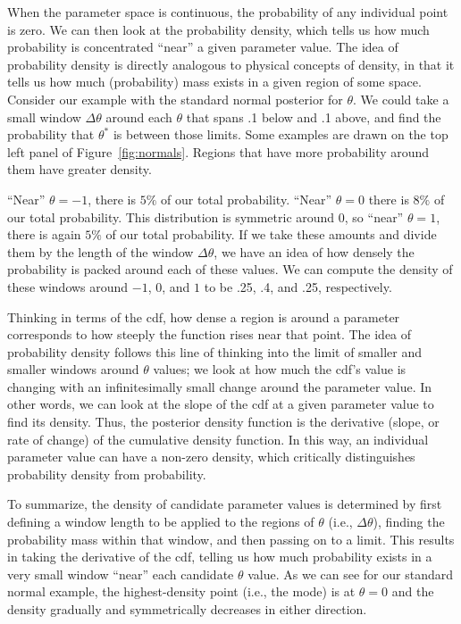 \documentclass[man]{apa}
\begin{document}
When the parameter space is continuous, the probability of any individual point is zero. We can then look at the probability density, which tells us how much probability is concentrated ``near'' a given parameter value. The idea of probability density is directly analogous to physical concepts of density, in that it tells us how much (probability) mass exists in a given region of some space. Consider our example with the standard normal posterior for $\theta$. We could take a small window $\Delta \theta$ around each $\theta$ that spans .1 below and .1 above, and find the probability that $\theta^*$ is between those limits. Some examples are drawn on the top left panel of Figure~\ref{fig:normals}.
Regions that have more probability around them have greater density.

``Near'' $\theta=-1$, there is $5\%$ of our total probability. ``Near'' $\theta=0$ there is $8\%$ of our total probability. This distribution is symmetric around 0, so ``near'' $\theta=1$, there is again $5\%$ of our total probability. If we take these amounts and divide them by the length of the window $\Delta \theta$, we have an idea of how densely the probability is packed around each of these values. We can compute the density of these windows around  $-1$, 0, and $1$ to be .25, .4, and .25, respectively. 

Thinking in terms of the cdf, how dense a region is around a parameter corresponds to how steeply the function rises near that point. The idea of probability density follows this line of thinking into the limit of smaller and smaller windows around $\theta$ values; we look at how much the cdf's value is changing with an infinitesimally small change around the parameter value. In other words, we can look at the slope of the cdf at a given parameter value to find its density. Thus, the posterior density function is the derivative (slope, or rate of change) of the cumulative density function. In this way, an individual parameter value can have a non-zero density, which critically distinguishes probability density from probability.

To summarize, the density of candidate parameter values is determined by first defining a window length to be applied to the regions of $\theta$ (i.e., $\Delta\theta$), finding the probability mass within that window, and then passing on to a limit. This results in taking the derivative of the cdf, telling us how much probability exists in a very small window ``near'' each candidate $\theta$ value. As we can see for our standard normal example, the highest-density point (i.e., the mode) is at $\theta=0$ and the density gradually and symmetrically decreases in either direction.
\end{document}
